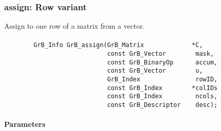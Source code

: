 \subsubsection{{\sf assign}: Row variant}

Assign to one row of a matrix from a vector.  

\paragraph{\syntax}

\begin{verbatim}
        GrB_Info GrB_assign(GrB_Matrix             *C,
                            const GrB_Vector        mask,
                            const GrB_BinaryOp      accum,
                            const GrB_Vector        u,
                            GrB_Index               rowID,
                            const GrB_Index        *colIDs
                            const GrB_Index         ncols,
                            const GrB_Descriptor    desc); 
\end{verbatim}

\paragraph{Parameters}

